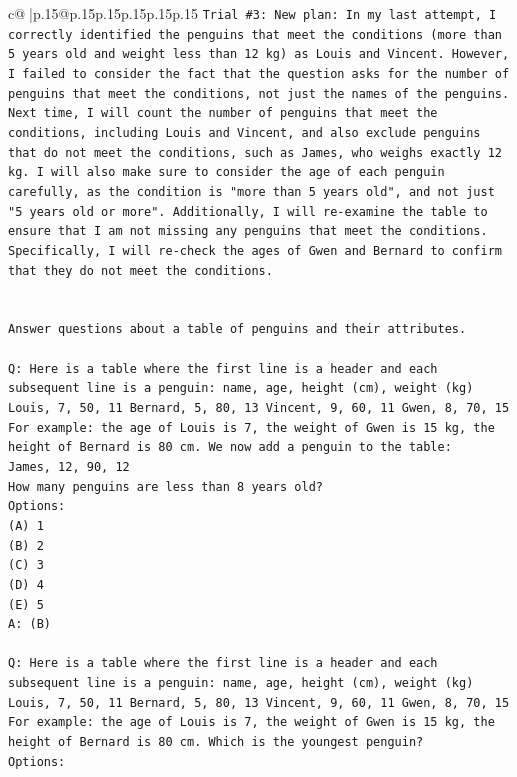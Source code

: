 \documentclass{article}
\begin{document}
{\begin{supertabular}{c@{$\;$}|p{.15\linewidth}@{}p{.15\linewidth}p{.15\linewidth}p{.15\linewidth}p{.15\linewidth}p{.15\linewidth}}
{{{\texttt{Trial \#3: New plan: In my last attempt, I correctly identified the penguins that meet the conditions (more than 5 years old and weight less than 12 kg) as Louis and Vincent. However, I failed to consider the fact that the question asks for the number of penguins that meet the conditions, not just the names of the penguins. Next time, I will count the number of penguins that meet the conditions, including Louis and Vincent, and also exclude penguins that do not meet the conditions, such as James, who weighs exactly 12 kg. I will also make sure to consider the age of each penguin carefully, as the condition is "more than 5 years old", and not just "5 years old or more". Additionally, I will re{-}examine the table to ensure that I am not missing any penguins that meet the conditions. Specifically, I will re{-}check the ages of Gwen and Bernard to confirm that they do not meet the conditions.} \\
\\ 
\\ 
\texttt{Answer questions about a table of penguins and their attributes.} \\
\\ 
\texttt{Q: Here is a table where the first line is a header and each subsequent line is a penguin:  name, age, height (cm), weight (kg) Louis, 7, 50, 11 Bernard, 5, 80, 13 Vincent, 9, 60, 11 Gwen, 8, 70, 15  For example: the age of Louis is 7, the weight of Gwen is 15 kg, the height of Bernard is 80 cm.  We now add a penguin to the table:} \\
\texttt{James, 12, 90, 12} \\
\texttt{How many penguins are less than 8 years old?} \\
\texttt{Options:} \\
\texttt{(A) 1} \\
\texttt{(B) 2} \\
\texttt{(C) 3} \\
\texttt{(D) 4} \\
\texttt{(E) 5} \\
\texttt{A: (B)} \\
\\ 
\texttt{Q: Here is a table where the first line is a header and each subsequent line is a penguin:  name, age, height (cm), weight (kg) Louis, 7, 50, 11 Bernard, 5, 80, 13 Vincent, 9, 60, 11 Gwen, 8, 70, 15  For example: the age of Louis is 7, the weight of Gwen is 15 kg, the height of Bernard is 80 cm.  Which is the youngest penguin?} \\
\texttt{Options:} \\
}}}
\end{supertabular}}
\end{document}
